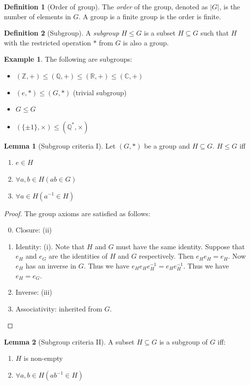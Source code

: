 \documentclass[a4paper]{article}
\theoremstyle{definition}
\newtheorem*{defi}{Definition}
\newtheorem*{eg}{Example}
\newtheorem*{lemma}{Lemma}
\newcommand{\Z}{\mathbb{Z}}
\newcommand{\Q}{\mathbb{Q}}
\newcommand{\R}{\mathbb{R}}
\newcommand{\C}{\mathbb{C}}
\begin{document}
\begin{defi}[Order of group]
  The \emph{order} of the group, denoted as $|G|$, is the number of elements in $G$. A group is a finite group is the order is finite.
\end{defi}
\begin{defi}[Subgroup]
  A \emph{subgroup} $H\leq G$ is a subset $H\subseteq G$ such that $H$ with the restricted operation $*$ from $G$ is also a group.
\end{defi}
\begin{eg}
  The following are subgroups:
  \begin{itemize}
  \item $(\Z, +)\leq (\Q, +) \leq (\R, +)\leq (\C, +)$
  \item $({e}, *) \leq (G, *)$ (trivial subgroup)
  \item $G \leq G$
  \item $(\{\pm 1\}, \times) \leq (\Q^*, \times)$
  \end{itemize}
\end{eg}
\begin{lemma}[Subgroup criteria I]
  Let $(G, *)$ be a group and $H\subseteq G$. $H \leq G$ iff
  \begin{enumerate}
  \item $e \in H$
  \item $\forall a, b\in H(ab \in G)$
  \item $\forall a \in H(a^{-1} \in H)$
  \end{enumerate}
\end{lemma}
\begin{proof}
  The group axioms are satisfied as follows:
  \begin{enumerate}[label=\arabic{*}.]
  \setcounter{enumi}{-1}
  \item Closure: (ii)
  \item Identity: (i). Note that $H$ and $G$ must have the same identity. Suppose that $e_H$ and $e_G$ are the identities of $H$ and $G$ respectively. Then $e_He_H = e_H$. Now $e_H$ has an inverse in $G$. Thus we have $e_He_He_H^{-1} = e_He_H^{-1}$. Thus we have $e_H = e_G$.
  \item Inverse: (iii)
  \item Associativity: inherited from $G$.
  \end{enumerate}
\end{proof}
\begin{lemma}[Subgroup criteria II]
  A subset $H\subseteq G$ is a subgroup of $G$ iff:
  \begin{enumerate}[label=(\Roman{*})]
  \item $H$ is non-empty
  \item $\forall a, b\in H(ab^{-1}\in H)$
  \end{enumerate}
\end{lemma}
\end{document}
